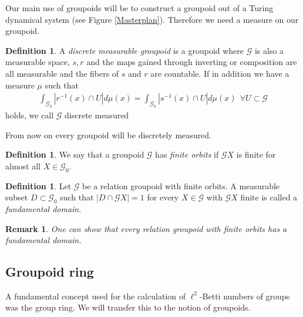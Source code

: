 \documentclass[12pt,a4paper]{scrartcl}
\theoremstyle{plain}
\newtheorem{Remark}[Theorem]{Remark}
\theoremstyle{definition}
\newtheorem{Definition}[Theorem]{Definition}
\numberwithin{equation}{section}
\newcommand{\2}{\mathbb{Z} / 2 \mathbb{Z}}
\newcommand{\G}{\mathcal{G}}
\newcommand{\1}{\bar{1}}
\newcommand{\0}{\bar{0}}
\begin{document}
Our main use of groupoids will be to construct a groupoid out of a Turing dynamical system (see Figure \ref{Masterplan}). Therefore we need a measure on our groupoid. 
\begin{Definition}
	A \emph{discrete measurable groupoid} is a groupoid where $\mathcal{G}$ is also a measurable space, $s, r$ and the maps gained through inverting or composition are all measurable and the fibers of $s$ and $r$ are countable.
	If in addition we have a measure $\mu$ such that 
	\begin{align*}
		\int_{\mathcal{G}_0} |r^{-1}(x) \cap U| d\mu(x) = \int_{\mathcal{G}_0} |s^{-1}(x) \cap U| d\mu(x) \ \ \forall U \subset \mathcal{G}
	\end{align*}
	holds, we call $\mathcal{G}$ discrete measured
\end{Definition}
From now on every groupoid will be discretely measured.
\begin{Definition}
	We say that a groupoid $\G$ has \emph{finite orbits} if $\G X$ is finite for almost all $X \in \G_0$.
\end{Definition}
\begin{Definition}
	Let $\G$ be a relation groupoid with finite orbits. A measurable subset $D \subset \G_0$ such that $|D \cap \G X| = 1$ for every $X \in \G$ with $\G X$ finite is called a \emph{fundamental domain}.
\end{Definition}
\begin{Remark}
	One can show that every relation groupoid with finite orbits has a fundamental domain.
\end{Remark}

\subsection{Groupoid ring}
A fundamental concept used for the calculation of $\ell^2$-Betti numbers of groups was the group ring. We will transfer this to the notion of groupoids.
\end{document}
